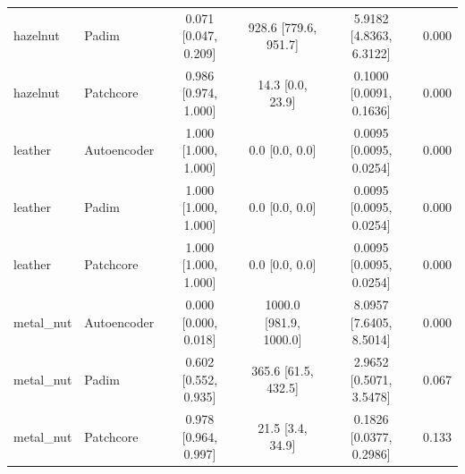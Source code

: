 \begin{table}[t]
\begin{tabular}{llcccc}
hazelnut & Padim & 0.071 [0.047, 0.209] & 928.6 [779.6, 951.7] & 5.9182 [4.8363, 6.3122] & 0.000 \\
hazelnut & Patchcore & 0.986 [0.974, 1.000] & 14.3 [0.0, 23.9] & 0.1000 [0.0091, 0.1636] & 0.000 \\
\midrule
leather & Autoencoder & 1.000 [1.000, 1.000] & 0.0 [0.0, 0.0] & 0.0095 [0.0095, 0.0254] & 0.000 \\
leather & Padim & 1.000 [1.000, 1.000] & 0.0 [0.0, 0.0] & 0.0095 [0.0095, 0.0254] & 0.000 \\
leather & Patchcore & 1.000 [1.000, 1.000] & 0.0 [0.0, 0.0] & 0.0095 [0.0095, 0.0254] & 0.000 \\
\midrule
metal_nut & Autoencoder & 0.000 [0.000, 0.018] & 1000.0 [981.9, 1000.0] & 8.0957 [7.6405, 8.5014] & 0.000 \\
metal_nut & Padim & 0.602 [0.552, 0.935] & 365.6 [61.5, 432.5] & 2.9652 [0.5071, 3.5478] & 0.067 \\
metal_nut & Patchcore & 0.978 [0.964, 0.997] & 21.5 [3.4, 34.9] & 0.1826 [0.0377, 0.2986] & 0.133 \\
\bottomrule
\end{tabular}
\end{table}
